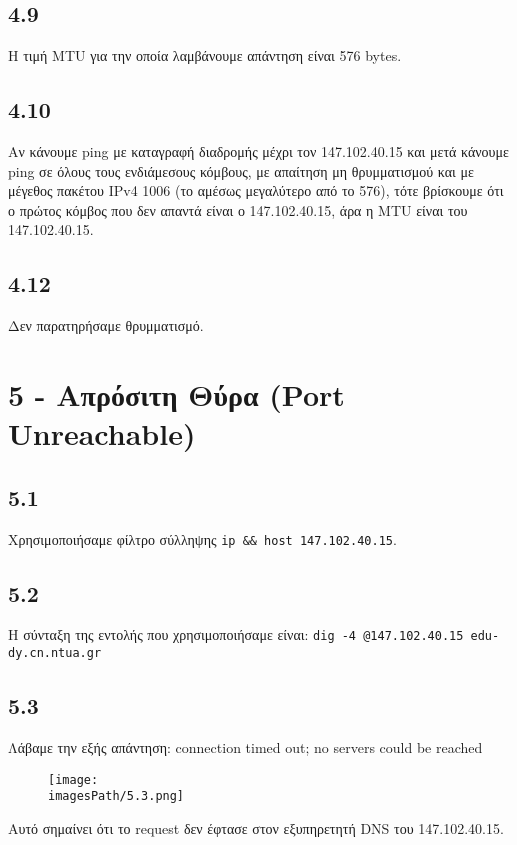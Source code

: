 		\subsection*{4.9}
			Η τιμή MTU για την οποία λαμβάνουμε απάντηση είναι 576 bytes.

		\subsection*{4.10}
			Αν κάνουμε ping με καταγραφή διαδρομής μέχρι τον 147.102.40.15 και μετά κάνουμε ping σε όλους τους ενδιάμεσους κόμβους, με απαίτηση μη θρυμματισμού και με μέγεθος πακέτου IPv4 1006 (το αμέσως μεγαλύτερο από το 576), τότε βρίσκουμε ότι ο πρώτος κόμβος που δεν απαντά είναι ο 147.102.40.15, άρα η MTU είναι του 147.102.40.15.

		\subsection*{4.12}
			Δεν παρατηρήσαμε θρυμματισμό.
 
	\section*{5 - Απρόσιτη Θύρα (Port Unreachable)}

		\subsection*{5.1}
			Χρησιμοποιήσαμε φίλτρο σύλληψης \verb|ip && host 147.102.40.15|.

		\subsection*{5.2}
			Η σύνταξη της εντολής που χρησιμοποιήσαμε είναι: \verb|dig -4 @147.102.40.15 edu-dy.cn.ntua.gr|

		\subsection*{5.3}
			Λάβαμε την εξής απάντηση: connection timed out; no servers could be reached
			
			\begin{figure}[H]
				\texttt{[image: \\imagesPath/5.3.png]}
			\end{figure}

			Αυτό σημαίνει ότι το request δεν έφτασε στον εξυπηρετητή DNS του 147.102.40.15.
			  
